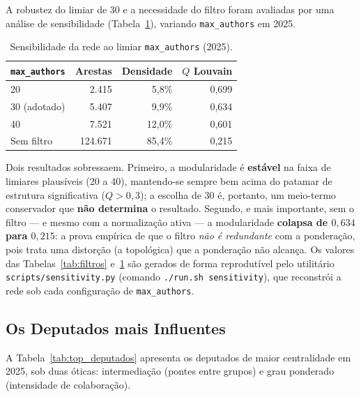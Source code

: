 \documentclass[
      12pt,
      a4paper,
      openright,
      oneside,
      chapter=TITLE,
      section=TITLE,
      english,
      french,
      spanish,
      brazilian
    ]{abntex2}
\begin{document}
    A robustez do limiar de 30 e a necessidade do filtro foram avaliadas por uma análise de sensibilidade (Tabela~\ref{tab:sensibilidade}), variando \texttt{max\_authors} em 2025.
    
    \begin{table}[H]
    \centering
    \caption{Sensibilidade da rede ao limiar \texttt{max\_authors} (2025).}
    \label{tab:sensibilidade}
    \begin{tabular}{lrrr}
    \toprule
    \texttt{max\_authors} & \textbf{Arestas} & \textbf{Densidade} & \textbf{$Q$ Louvain} \\
    \midrule
    20                 & 2.415   & 5,8\%  & 0,699 \\
    30 (adotado)       & 5.407   & 9,9\%  & 0,634 \\
    40                 & 7.521   & 12,0\% & 0,601 \\
    Sem filtro         & 124.671 & 85,4\% & 0,215 \\
    \bottomrule
    \end{tabular}
    \end{table}
    
    Dois resultados sobressaem. Primeiro, a modularidade é \textbf{estável} na faixa de limiares plausíveis (20 a 40), mantendo-se sempre bem acima do patamar de estrutura significativa ($Q > 0{,}3$); a escolha de 30 é, portanto, um meio-termo conservador que \textbf{não determina} o resultado. Segundo, e mais importante, sem o filtro --- e mesmo com a normalização ativa --- a modularidade \textbf{colapsa de $0{,}634$ para $0{,}215$}: a prova empírica de que o filtro \emph{não é redundante} com a ponderação, pois trata uma distorção (a topológica) que a ponderação não alcança. Os valores das Tabelas~\ref{tab:filtros} e~\ref{tab:sensibilidade} são gerados de forma reprodutível pelo utilitário \texttt{scripts/sensitivity.py} (comando \texttt{./run.sh sensitivity}), que reconstrói a rede sob cada configuração de \texttt{max\_authors}.
    
    \subsection{Os Deputados mais Influentes}
    
    A Tabela~\ref{tab:top_deputados} apresenta os deputados de maior centralidade em 2025, sob duas óticas: intermediação (pontes entre grupos) e grau ponderado (intensidade de colaboração).
    
\end{document}
